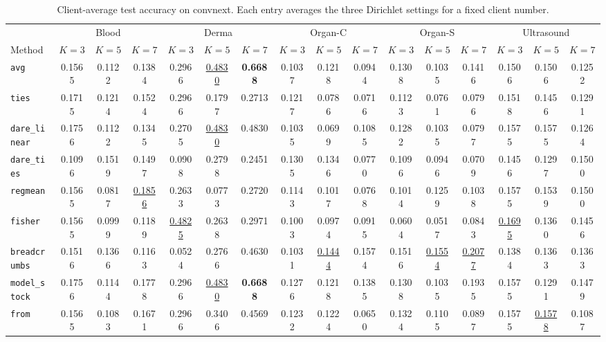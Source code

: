 \begin{table}[t]
\centering
\scriptsize
\setlength{\tabcolsep}{2.6pt}
\caption{Client-average test accuracy on convnext. Each entry averages the three Dirichlet settings for a fixed client number.}
\label{tab:client-avg-convnext}
\begin{tabular}{lccccccccccccccc}
\toprule
& \multicolumn{3}{c}{Blood} & \multicolumn{3}{c}{Derma} & \multicolumn{3}{c}{Organ-C} & \multicolumn{3}{c}{Organ-S} & \multicolumn{3}{c}{Ultrasound} \\
\cmidrule(lr){2-4}\cmidrule(lr){5-7}\cmidrule(lr){8-10}\cmidrule(lr){11-13}\cmidrule(lr){14-16}
Method & $K=3$ & $K=5$ & $K=7$ & $K=3$ & $K=5$ & $K=7$ & $K=3$ & $K=5$ & $K=7$ & $K=3$ & $K=5$ & $K=7$ & $K=3$ & $K=5$ & $K=7$ \\
\midrule
\texttt{avg} & 0.1565 & 0.1122 & 0.1384 & 0.2966 & \underline{0.4830} & \textbf{0.6688} & 0.1037 & 0.1218 & 0.0944 & 0.1308 & 0.1035 & 0.1416 & 0.1506 & 0.1506 & 0.1252 \\
\texttt{ties} & 0.1715 & 0.1214 & 0.1524 & 0.2966 & 0.1797 & 0.2713 & 0.1217 & 0.0786 & 0.0716 & 0.1123 & 0.0761 & 0.0796 & 0.1518 & 0.1456 & 0.1291 \\
\texttt{dare\_linear} & 0.1756 & 0.1122 & 0.1345 & 0.2705 & \underline{0.4830} & 0.4830 & 0.1035 & 0.0699 & 0.1085 & 0.1282 & 0.1035 & 0.0797 & 0.1575 & 0.1575 & 0.1264 \\
\texttt{dare\_ties} & 0.1096 & 0.1519 & 0.1497 & 0.0908 & 0.2798 & 0.2451 & 0.1305 & 0.1346 & 0.0770 & 0.1096 & 0.0946 & 0.0709 & 0.1456 & 0.1297 & 0.1500 \\
\texttt{regmean} & 0.1565 & 0.0817 & \underline{0.1856} & 0.2633 & 0.0773 & 0.2720 & 0.1143 & 0.1017 & 0.0768 & 0.1014 & 0.1259 & 0.1038 & 0.1575 & 0.1539 & 0.1500 \\
\texttt{fisher} & 0.1565 & 0.0999 & 0.1189 & \underline{0.4825} & 0.2638 & 0.2971 & 0.1003 & 0.0974 & 0.0915 & 0.0604 & 0.0517 & 0.0843 & \underline{0.1695} & 0.1360 & 0.1456 \\
\texttt{breadcrumbs} & 0.1516 & 0.1366 & 0.1163 & 0.0524 & 0.2766 & 0.4630 & 0.1031 & \underline{0.1444} & 0.1574 & 0.1516 & \underline{0.1554} & \underline{0.2077} & 0.1384 & 0.1363 & 0.1363 \\
\texttt{model\_stock} & 0.1756 & 0.1144 & 0.1778 & 0.2966 & \underline{0.4830} & \textbf{0.6688} & 0.1276 & 0.1218 & 0.1385 & 0.1308 & 0.1035 & 0.1935 & 0.1575 & 0.1291 & 0.1479 \\
\texttt{from} & 0.1565 & 0.1083 & 0.1671 & 0.2966 & 0.3406 & 0.4569 & 0.1232 & 0.1224 & 0.0650 & 0.1324 & 0.1105 & 0.0897 & 0.1575 & \underline{0.1578} & 0.1087 \\

\end{tabular}
\end{table}

